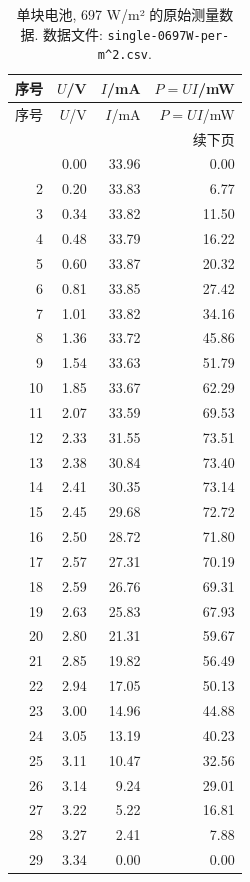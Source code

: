\documentclass[UTF8,a4paper,11pt]{ctexart}
\begin{document}
\begin{longtable}{rrrr}
\caption{单块电池, 697 W/m² 的原始测量数据. 数据文件: \texttt{single-0697W-per-m\textasciicircum{}2.csv}.}\\
\toprule
序号 & $U$/V & $I$/mA & $P=UI$/mW \\
\midrule
\endfirsthead
\toprule
序号 & $U$/V & $I$/mA & $P=UI$/mW \\
\midrule
\endhead
\midrule
\multicolumn{4}{r}{续下页} \\
\endfoot
\bottomrule
\endlastfoot
1 & 0.00 & 33.96 & 0.00 \\
2 & 0.20 & 33.83 & 6.77 \\
3 & 0.34 & 33.82 & 11.50 \\
4 & 0.48 & 33.79 & 16.22 \\
5 & 0.60 & 33.87 & 20.32 \\
6 & 0.81 & 33.85 & 27.42 \\
7 & 1.01 & 33.82 & 34.16 \\
8 & 1.36 & 33.72 & 45.86 \\
9 & 1.54 & 33.63 & 51.79 \\
10 & 1.85 & 33.67 & 62.29 \\
11 & 2.07 & 33.59 & 69.53 \\
12 & 2.33 & 31.55 & 73.51 \\
13 & 2.38 & 30.84 & 73.40 \\
14 & 2.41 & 30.35 & 73.14 \\
15 & 2.45 & 29.68 & 72.72 \\
16 & 2.50 & 28.72 & 71.80 \\
17 & 2.57 & 27.31 & 70.19 \\
18 & 2.59 & 26.76 & 69.31 \\
19 & 2.63 & 25.83 & 67.93 \\
20 & 2.80 & 21.31 & 59.67 \\
21 & 2.85 & 19.82 & 56.49 \\
22 & 2.94 & 17.05 & 50.13 \\
23 & 3.00 & 14.96 & 44.88 \\
24 & 3.05 & 13.19 & 40.23 \\
25 & 3.11 & 10.47 & 32.56 \\
26 & 3.14 & 9.24 & 29.01 \\
27 & 3.22 & 5.22 & 16.81 \\
28 & 3.27 & 2.41 & 7.88 \\
29 & 3.34 & 0.00 & 0.00 \\
\end{longtable}
\newpage
\end{document}
